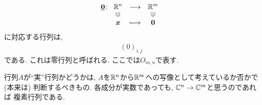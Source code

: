 \begin{remark}
  \begin{align*}
    \underline{\zzero}\colon
    \Shazo{\RR^n}{\RR^m}
          {\xx}{\zzero}
\end{align*}
  に対応する行列は,
\begin{align*}
  (0)_{i,j}
\end{align*}
である.
これは零行列と呼ばれる.
ここでは$O_{m,n}$で表す.
\end{remark}
\begin{remark}
  行列$A$が``実''行列かどうかは,
  $A$を$\mathbb{R}^n$から$\mathbb{R}^m$への写像として考えているか否かで
  (本来は) 判断するべきもの.
  各成分が実数であっても,
  $\mathbb{C}^n\to \mathbb{C}^m$と思うのであれば
  複素行列である.
\end{remark}



